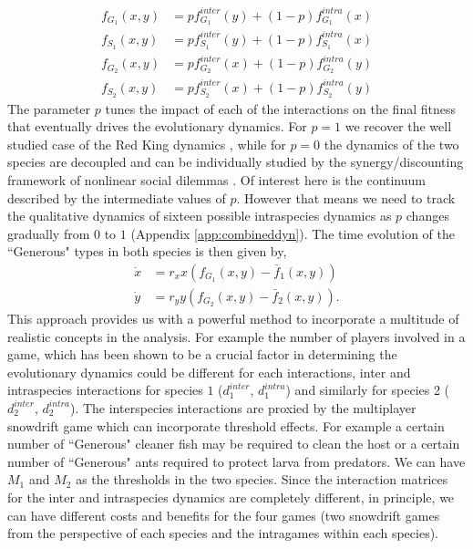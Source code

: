 \documentclass[12pt]{article}
\begin{document}
%
\begin{align}
\label{eq:combinedfiteqs}
	f_{G_1} (x,y) &= p f^{inter}_{G_1} (y) + (1-p) f^{intra}_{G_1} (x) \nonumber \\
	f_{S_1} (x,y) &= p f^{inter}_{S_1} (y) + (1-p) f^{intra}_{S_1} (x) \nonumber \\
	f_{G_2} (x,y) &= p f^{inter}_{G_2} (x) + (1-p) f^{intra}_{G_2} (y) \\
	f_{S_2} (x,y) &= p f^{inter}_{S_2} (x) + (1-p) f^{intra}_{S_2} (y) \nonumber
\end{align}
%
The parameter $p$ tunes the impact of each of the interactions on the final fitness that eventually drives the evolutionary dynamics.
For $p=1$ we recover the well studied case of the Red King dynamics \citep{gokhale:PRSB:2012}, while for $p=0$ the dynamics of the two species are  decoupled and can be individually studied by the synergy/discounting framework of nonlinear social dilemmas \citep{hauert:JTB:2006a}.
Of interest here is the continuum described by the intermediate values of $p$.
However that means we need to track the qualitative dynamics of sixteen possible intraspecies dynamics as $p$ changes gradually from $0$ to $1$ (Appendix \ref{app:combineddyn}). 
The time evolution of the ``Generous" types in both species is then given by,
%
\begin{align}
\dot{x} &= r_x x \left(f_{G_1}(x,y) -  \bar{f}_1(x,y) \right) \nonumber \\
\dot{y} &= r_y y \left(f_{G_2}(x,y) -  \bar{f}_2(x,y) \right).
\label{eq:repeq}
\end{align}
%
This approach provides us with a powerful method to incorporate a multitude of realistic concepts in the analysis.
For example the number of players involved in a game, which has been shown to be a crucial factor in determining the evolutionary dynamics could be different for each interactions, inter and intraspecies interactions for species $1$ ($d^{inter}_1$, $d^{intra}_1$) and similarly for species 2 ($d^{inter}_2$, $d^{intra}_2$). 
The interspecies interactions are proxied by the multiplayer snowdrift game which can incorporate threshold effects.
For example a certain number of ``Generous" cleaner fish may be required to clean the host or a certain number of ``Generous" ants required to protect larva from predators.
We can have $M_1$ and $M_2$ as the thresholds in the two species.
Since the interaction matrices for the inter and intraspecies dynamics are completely different, in principle, we can have different costs and benefits for the four games (two snowdrift games from the perspective of each species and the intragames within each species).
\end{document}

